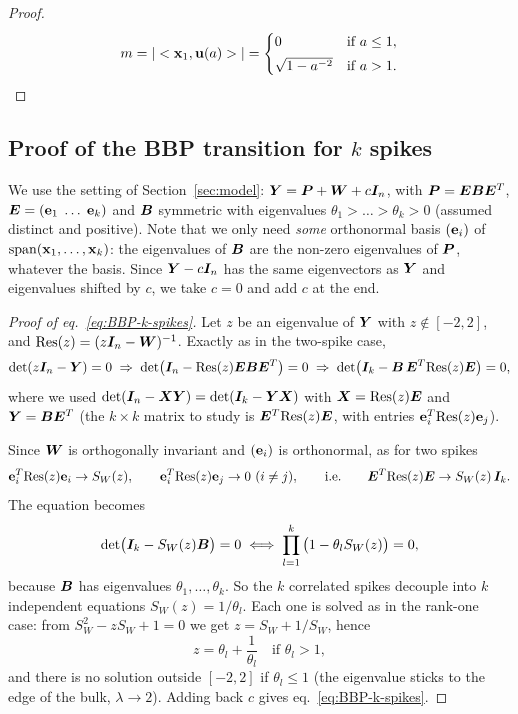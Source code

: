\begin{proof}
    \[
        m = |< \boldsymbol{\mathbf{x}}_1 , \boldsymbol{\mathbf{u}}(a)>|= \begin{cases}
        0 & \text{if } a \le 1,\\[0.3em]
        \sqrt{1-a^{-2}} & \text{if } a > 1.
    \end{cases}
    \]
    \label{proof:BBP1}
    
\end{proof}

\subsection{Proof of the BBP transition for $k$ spikes}\label{proof:BBP_k_spikes}

We use the setting of Section~\ref{sec:model}: $\bm{Y}=\bm{P}+\bm{W}+c\bm{I}_n$, with $\bm{P}=\bm{E}\bm{B}\bm{E}^T$, $\bm{E}=(\boldsymbol{\mathbf{e}}_1\;\dots\;\boldsymbol{\mathbf{e}}_k)$ and $\bm{B}$ symmetric with eigenvalues $\theta_1>\dots>\theta_k>0$ (assumed distinct and positive). Note that we only need \emph{some} orthonormal basis $(\boldsymbol{\mathbf{e}}_i)$ of $\mathrm{span}(\boldsymbol{\mathbf{x}}_1,\dots,\boldsymbol{\mathbf{x}}_k)$: the eigenvalues of $\bm{B}$ are the non-zero eigenvalues of $\bm{P}$, whatever the basis. Since $\bm{Y}-c\bm{I}_n$ has the same eigenvectors as $\bm{Y}$ and eigenvalues shifted by $c$, we take $c=0$ and add $c$ at the end.

\begin{proof}[Proof of eq.~\eqref{eq:BBP-k-spikes}]
Let $z$ be an eigenvalue of $\bm{Y}$ with $z\notin[-2,2]$, and $\mathrm{Res}(z)=(z\bm{I}_n-\bm{W})^{-1}$. Exactly as in the two-spike case,
\[
\mathrm{det}(z\bm{I}_n-\bm{Y})=0
\;\Rightarrow\;
\mathrm{det}\big(\bm{I}_n-\mathrm{Res}(z)\bm{E}\bm{B}\bm{E}^T\big)=0
\;\Rightarrow\;
\mathrm{det}\big(\bm{I}_k-\bm{B}\,\bm{E}^T\mathrm{Res}(z)\bm{E}\big)=0,
\]
where we used $\mathrm{det}(\bm{I}_n-\bm{X}\bm{Y})=\mathrm{det}(\bm{I}_k-\bm{Y}\bm{X})$ with $\bm{X}=\mathrm{Res}(z)\bm{E}$ and $\bm{Y}=\bm{B}\bm{E}^T$ (the $k\times k$ matrix to study is $\bm{E}^T\mathrm{Res}(z)\bm{E}$, with entries $\boldsymbol{\mathbf{e}}_i^T\mathrm{Res}(z)\boldsymbol{\mathbf{e}}_j$).

Since $\bm{W}$ is orthogonally invariant and $(\boldsymbol{\mathbf{e}}_i)$ is orthonormal, as for two spikes
\[
\boldsymbol{\mathbf{e}}_i^T\mathrm{Res}(z)\boldsymbol{\mathbf{e}}_i\to S_W(z),\qquad \boldsymbol{\mathbf{e}}_i^T\mathrm{Res}(z)\boldsymbol{\mathbf{e}}_j\to0\ (i\neq j),
\qquad\text{i.e.}\qquad
\bm{E}^T\mathrm{Res}(z)\bm{E}\to S_W(z)\,\bm{I}_k .
\]
The equation becomes
\[
\mathrm{det}\big(\bm{I}_k-S_W(z)\bm{B}\big)=0
\;\Longleftrightarrow\;
\prod_{l=1}^k\big(1-\theta_l S_W(z)\big)=0,
\]
because $\bm{B}$ has eigenvalues $\theta_1,\dots,\theta_k$. So the $k$ correlated spikes decouple into $k$ independent equations $S_W(z)=1/\theta_l$. Each one is solved as in the rank-one case: from $S_W^2-zS_W+1=0$ we get $z=S_W+1/S_W$, hence
\[
z=\theta_l+\frac1{\theta_l}\quad\text{if }\theta_l>1,
\]
and there is no solution outside $[-2,2]$ if $\theta_l\le1$ (the eigenvalue sticks to the edge of the bulk, $\lambda\to2$). Adding back $c$ gives eq.~\eqref{eq:BBP-k-spikes}.
\end{proof}

